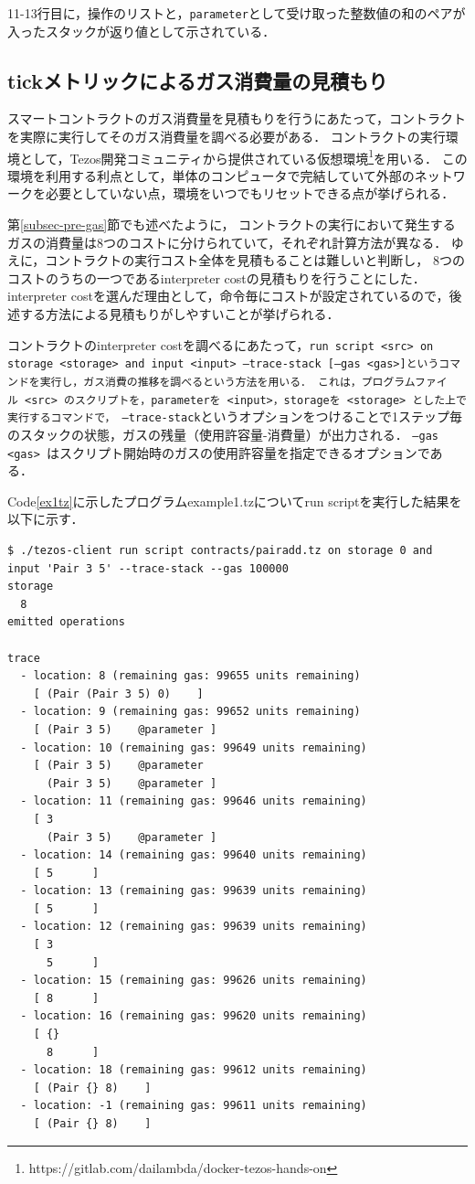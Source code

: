 \documentclass{kuisthesis}
\begin{document}
11-13行目に，操作のリストと，{\tt parameter}として受け取った整数値の和のペアが入ったスタックが返り値として示されている．


\subsection{tickメトリックによるガス消費量の見積もり} \label{subsec-pro-gas}
スマートコントラクトのガス消費量を見積もりを行うにあたって，コントラクトを実際に実行してそのガス消費量を調べる必要がある．
コントラクトの実行環境として，Tezos開発コミュニティから提供されている仮想環境\footnote{https://gitlab.com/dailambda/docker-tezos-hands-on}を用いる．
この環境を利用する利点として，単体のコンピュータで完結していて外部のネットワークを必要としていない点，環境をいつでもリセットできる点が挙げられる．

第\ref{subsec-pre-gas}節でも述べたように，
コントラクトの実行において発生するガスの消費量は8つのコストに分けられていて，それぞれ計算方法が異なる．
ゆえに，コントラクトの実行コスト全体を見積もることは難しいと判断し，
8つのコストのうちの一つであるinterpreter costの見積もりを行うことにした．
interpreter costを選んだ理由として，命令毎にコストが設定されているので，後述する方法による見積もりがしやすいことが挙げられる．

コントラクトのinterpreter costを調べるにあたって，{\tt run script <src> on storage <storage> and input <input> --trace-stack [--gas <gas>]というコマンドを実行し，ガス消費の推移を調べるという方法を用いる．
これは，プログラムファイル\ <src>\ のスクリプトを，parameterを\ <input>，storageを\ <storage>\ とした上で実行するコマンドで，
--trace-stack}というオプションをつけることで1ステップ毎のスタックの状態，ガスの残量（使用許容量-消費量）が出力される．
{\tt --gas <gas>\ }はスクリプト開始時のガスの使用許容量を指定できるオプションである．

Code\ref{ex1tz}に示したプログラムexample1.tzについてrun scriptを実行した結果を以下に示す．

\begin{lstlisting}[basicstyle={\ttfamily\color{base}\scriptsize}]
$ ./tezos-client run script contracts/pairadd.tz on storage 0 and input 'Pair 3 5' --trace-stack --gas 100000
storage
  8
emitted operations
  
trace
  - location: 8 (remaining gas: 99655 units remaining)
    [ (Pair (Pair 3 5) 0)  	 ]
  - location: 9 (remaining gas: 99652 units remaining)
    [ (Pair 3 5)  	@parameter ]
  - location: 10 (remaining gas: 99649 units remaining)
    [ (Pair 3 5)  	@parameter
      (Pair 3 5)  	@parameter ]
  - location: 11 (remaining gas: 99646 units remaining)
    [ 3  	
      (Pair 3 5)  	@parameter ]
  - location: 14 (remaining gas: 99640 units remaining)
    [ 5  	 ]
  - location: 13 (remaining gas: 99639 units remaining)
    [ 5  	 ]
  - location: 12 (remaining gas: 99639 units remaining)
    [ 3  	
      5  	 ]
  - location: 15 (remaining gas: 99626 units remaining)
    [ 8  	 ]
  - location: 16 (remaining gas: 99620 units remaining)
    [ {}  	
      8  	 ]
  - location: 18 (remaining gas: 99612 units remaining)
    [ (Pair {} 8)  	 ]
  - location: -1 (remaining gas: 99611 units remaining)
    [ (Pair {} 8)  	 ]
\end{lstlisting}
\end{document}
